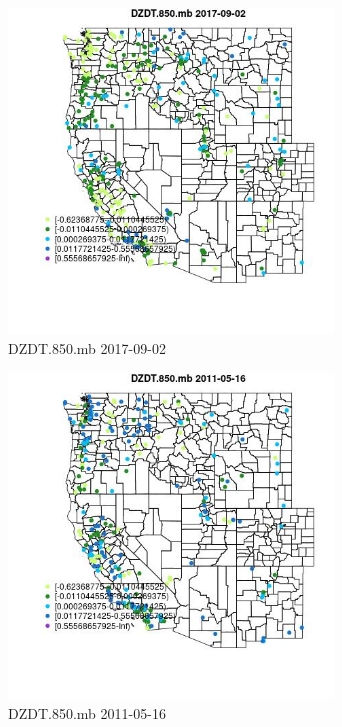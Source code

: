 \begin{figure} 
\centering  
\includegraphics[width=0.77\textwidth]{Code_Outputs/Report_ML_input_PM25_Step4_part_e_de_duplicated_aves_compiled_2019-05-20wNAs_MapObsDZDT850mb2017-09-02.jpg} 
\caption{\label{fig:Report_ML_input_PM25_Step4_part_e_de_duplicated_aves_compiled_2019-05-20wNAsMapObsDZDT850mb2017-09-02}DZDT.850.mb 2017-09-02} 
\end{figure} 
 

\begin{figure} 
\centering  
\includegraphics[width=0.77\textwidth]{Code_Outputs/Report_ML_input_PM25_Step4_part_e_de_duplicated_aves_compiled_2019-05-20wNAs_MapObsDZDT850mb2011-05-16.jpg} 
\caption{\label{fig:Report_ML_input_PM25_Step4_part_e_de_duplicated_aves_compiled_2019-05-20wNAsMapObsDZDT850mb2011-05-16}DZDT.850.mb 2011-05-16} 
\end{figure} 
 

